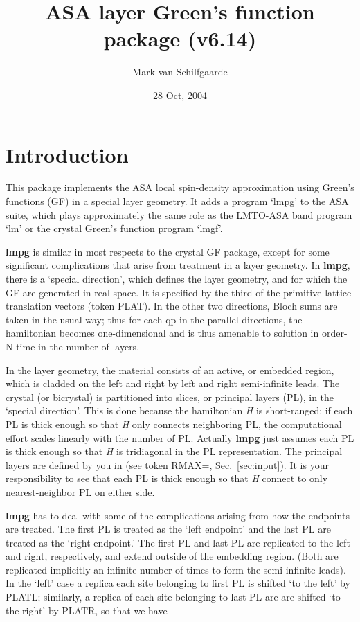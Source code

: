 \documentclass{article}
\begin{document}
\title{ASA layer Green's function package (v6.14)}
\author{Mark van Schilfgaarde}
\date{28 Oct, 2004}
\maketitle

\section{Introduction}
\label{sec:intro}

This package implements the ASA local spin-density approximation
using Green's functions (GF) in a special layer geometry.  It
adds a program `lmpg' to the ASA suite, which plays approximately
the same role as the LMTO-ASA band program `lm' or the crystal
Green's function program `lmgf'.

{\bf lmpg} is similar in most respects to the crystal GF package, except for
some significant complications that arise from treatment in a layer
geometry.  In {\bf lmpg}, there is a `special direction', which defines the
layer geometry, and for which the GF are generated in real space.  It
is specified by the third of the primitive lattice translation vectors
(token PLAT).  In the other two directions, Bloch sums are taken in
the usual way; thus for each qp in the parallel directions, the
hamiltonian becomes one-dimensional and is thus amenable to solution
in order-N time in the number of layers.

In the layer geometry, the material consists of an active, or
embedded region, which is cladded on the left and right by left
and right semi-infinite leads.  The crystal (or bicrystal) is
partitioned into slices, or principal layers (PL), in the
`special direction'.  This is done because the hamiltonian {\em
H} is short-ranged: if each PL is thick enough so that {\em H}
only connects neighboring PL, the computational effort scales
linearly with the number of PL.  Actually {\bf lmpg} just assumes
each PL is thick enough so that {\em H} is tridiagonal in the PL
representation.  The principal layers are defined by you in (see
token RMAX=, Sec.~\ref{sec:input}).  It is your responsibility to
see that each PL is thick enough so that {\em H} connect to only
nearest-neighbor PL on either side.

{\bf lmpg} has to deal with some of the complications arising
from how the endpoints are treated.  The first PL is treated as
the `left endpoint' and the last PL are treated as the `right
endpoint.'  The first PL and last PL are replicated to the left
and right, respectively, and extend outside of the embedding
region.  (Both are replicated implicitly an infinite number of
times to form the semi-infinite leads).  In the `left' case a
replica each site belonging to first PL is shifted `to the left'
by PLATL; similarly, a replica of each site belonging to last PL
are are shifted `to the right' by PLATR, so that we have
\end{document}
